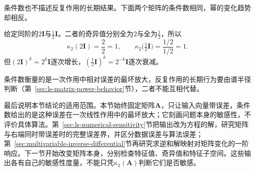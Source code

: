 条件数也不描述反复作用的长期结果。下面两个矩阵的条件数相同，幂的变化趋势却相反。
\begin{example}[条件数相同而幂的趋势相反]
\label{ex:ls-condition-number-vs-powers}
给定同阶的$2\bm I$与$\tfrac12\bm I$。二者的奇异值分别全为$2$与全为$\tfrac12$，所以
\[
 \kappa_2(2\bm I)=\frac{2}{2}=1,\qquad
 \kappa_2\bigl(\tfrac12\bm I\bigr)=\frac{1/2}{1/2}=1 .
\]
但$(2\bm I)^k=2^k\bm I$逐次增长，$(\tfrac12\bm I)^k=2^{-k}\bm I$逐次衰减。
\end{example}
条件数衡量的是一次作用中相对误差的最坏放大，反复作用的长期行为要由谱半径判断（第~\ref{sec:ls-matrix-power-behavior}节），二者不能互相代替。

最后说明本节结论的适用范围。本节始终固定矩阵$\bm A$，只让输入向量带误差，条件数给出的是这种误差在一次线性作用中的最坏放大；它刻画问题本身的敏感性，不评价具体算法。第~\ref{sec:ls-numerical-sensitivity}节把输出改为方程的解，研究矩阵与右端同时带误差时的完整误差界，并区分数据误差与算法误差；第~\ref{sec:multivariable-inverse-differential}节再研究求逆和解映射对矩阵变化的一阶响应。下一节开始改变矩阵本身，分别检查特征值、奇异值和特征子空间。这些输出各有自己的敏感性度量，不能只凭$\kappa_2(\bm A)$判断它们是否敏感。
